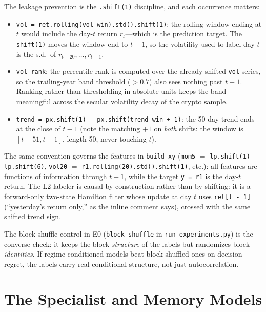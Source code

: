 The leakage prevention is the \texttt{.shift(1)} discipline, and each
occurrence matters:
\begin{itemize}
  \item \texttt{vol = ret.rolling(vol\_win).std().shift(1)}: the rolling
        window ending at $t$ would include the day-$t$ return $r_t$---which
        is the prediction target. The \texttt{shift(1)} moves the window end
        to $t-1$, so the volatility used to label day $t$ is the s.d.\ of
        $r_{t-20}, \dots, r_{t-1}$.
  \item \texttt{vol\_rank}: the percentile rank is computed over the
        already-shifted \texttt{vol} series, so the trailing-year band
        threshold ($>0.7$) also sees nothing past $t-1$. Ranking rather
        than thresholding in absolute units keeps the band meaningful across
        the secular volatility decay of the crypto sample.
  \item \texttt{trend = px.shift(1) - px.shift(trend\_win + 1)}: the 50-day
        trend ends at the close of $t-1$ (note the matching $+1$ on
        \emph{both} shifts: the window is $[t-51, t-1]$, length 50, never
        touching $t$).
\end{itemize}
The same convention governs the features in \texttt{build\_xy}
(\texttt{mom5} $=$ \texttt{lp.shift(1) - lp.shift(6)}, \texttt{vol20} $=$
\texttt{r1.rolling(20).std().shift(1)}, etc.): all features are functions of
information through $t-1$, while the target \texttt{y = r1} is the day-$t$
return. The L2 labeler is causal by construction rather than by shifting: it
is a forward-only two-state Hamilton filter whose update at day $t$ uses
\texttt{ret[t - 1]} (``yesterday's return only,'' as the inline comment
says), crossed with the same shifted trend sign.

\begin{intuition}
The block-shuffle control in E0 (\texttt{block\_shuffle} in
\texttt{run\_experiments.py}) is the converse check: it keeps the block
\emph{structure} of the labels but randomizes block \emph{identities}. If
regime-conditioned models beat block-shuffled ones on decision regret, the
labels carry real conditional structure, not just autocorrelation.
\end{intuition}


\section{The Specialist and Memory Models}
\label{sec:dd6-specialist}

